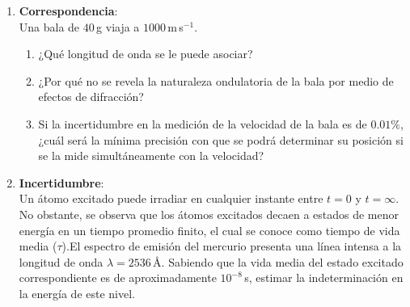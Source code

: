 \documentclass[a4paper,12pt]{article}
\begin{document}
\begin{enumerate}
\item {\bf{Correspondencia}}:\\
	Una bala de $40$\,g viaja a $1000$\,m\,s$^{-1}$.
	\begin{enumerate}
		\item ¿Qué longitud de onda se le puede asociar? 
		\item ¿Por qué no se revela la naturaleza ondulatoria de la bala por
			medio de efectos de difracción? 
		\item Si la incertidumbre en la medición de la velocidad de la bala es
			de $0.01\%$, ¿cuál será la mínima precisión con que se podrá
			determinar su posición si se la mide simultáneamente con la
			velocidad?
	\end{enumerate}

\item {\bf{Incertidumbre}}:\\
	Un átomo excitado puede irradiar en cualquier instante entre $t = 0$ y $t =
	\infty$. No obstante, se observa que los átomos excitados decaen a estados
	de menor energía en un tiempo promedio finito, el cual se conoce como
	tiempo de vida media ($\tau$).El espectro de emisión del mercurio presenta
	una línea intensa a la longitud de onda $\lambda =2536$\,\AA. Sabiendo que
	la vida media del estado excitado correspondiente es de aproximadamente
	$10^{-8}$\,s, estimar la indeterminación en la energía de este nivel.

\end{enumerate}
\end{document}
